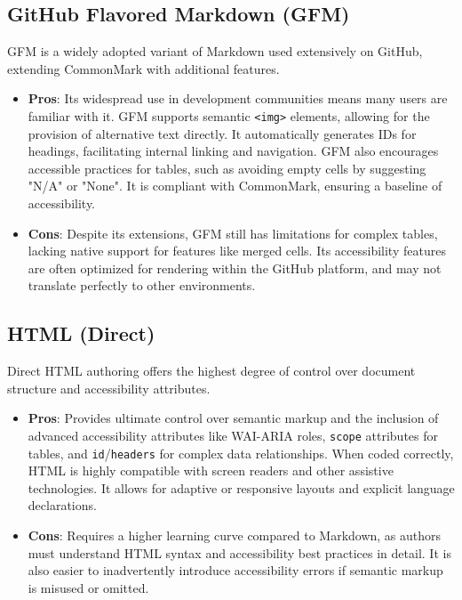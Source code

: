 \subsection{GitHub Flavored Markdown (GFM)}
GFM is a widely adopted variant of Markdown used extensively on GitHub, extending CommonMark with additional features.\cite{GitHubDocs}
\begin{itemize}
    \item \textbf{Pros}: Its widespread use in development communities means many users are familiar with it. GFM supports semantic \texttt{<img>} elements, allowing for the provision of alternative text directly.\cite{GitHubDocs}\cite{TestPros} It automatically generates IDs for headings, facilitating internal linking and navigation.\cite{GitLabDocs} GFM also encourages accessible practices for tables, such as avoiding empty cells by suggesting "N/A" or "None".\cite{GitLabDocs} It is compliant with CommonMark, ensuring a baseline of accessibility.\cite{GitHubDocs}
    \item \textbf{Cons}: Despite its extensions, GFM still has limitations for complex tables, lacking native support for features like merged cells.\cite{DocsToMarkdown} Its accessibility features are often optimized for rendering within the GitHub platform, and may not translate perfectly to other environments.
\end{itemize}

\subsection{HTML (Direct)}
Direct HTML authoring offers the highest degree of control over document structure and accessibility attributes.
\begin{itemize}
    \item \textbf{Pros}: Provides ultimate control over semantic markup and the inclusion of advanced accessibility attributes like WAI-ARIA roles, \texttt{scope} attributes for tables, and \texttt{id}/\texttt{headers} for complex data relationships.\cite{MDNHTML}\cite{UniversalDesign}\cite{MDNTableAccess} When coded correctly, HTML is highly compatible with screen readers and other assistive technologies.\cite{ReciteMe} It allows for adaptive or responsive layouts and explicit language declarations.\cite{UniversalDesign}\cite{QuartoCommonMark}
    \item \textbf{Cons}: Requires a higher learning curve compared to Markdown, as authors must understand HTML syntax and accessibility best practices in detail.\cite{UniversalDesign} It is also easier to inadvertently introduce accessibility errors if semantic markup is misused or omitted.\cite{UniversalDesign}
\end{itemize}

